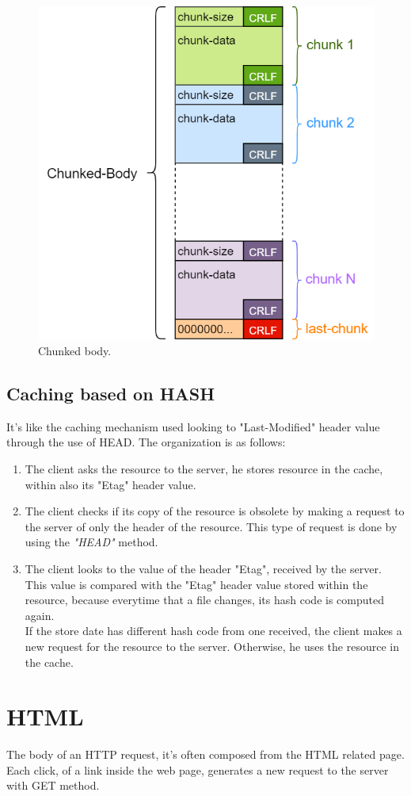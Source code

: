 \begin{figure}[h]
\centering
\includegraphics[scale=0.5]{Images/HTTP/Chunked-Body}\caption{\footnotesize{Chunked body.}}\label{chunked_body}
\end{figure}

\subsection{Caching based on HASH}
It's like the caching mechanism used looking to "Last-Modified" header value through the use of HEAD. The organization is as follows:
\begin{enumerate}
\item{The client asks the resource to the server, he stores resource in the cache, within also its "Etag" header value.}
\item{The client checks if its copy of the resource is obsolete by making a request to the server of only the header of the resource. This type of request is done by using the \textit{"HEAD"} method.}
\item{The client looks to the value of the header "Etag", received by the server. This value is compared with the "Etag" header value stored within the resource, because everytime that a file changes, its hash code is computed again.\\
If the store date has different hash code from one received, the client makes a new request for the resource to the server. Otherwise, he uses the resource in the cache.}
\end{enumerate}

\section{HTML}
The body of an HTTP request, it's often composed from the HTML related page. Each click, of a link inside the web page, generates a new request to the server with GET method.
